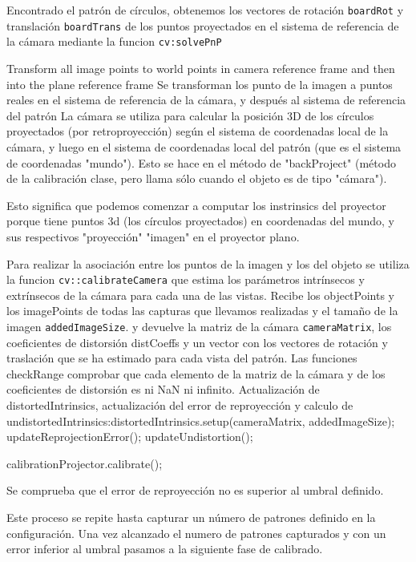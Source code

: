   
Encontrado el patrón de círculos, obtenemos los vectores de rotación \texttt{boardRot} y translación \texttt{boardTrans} de los puntos proyectados en el sistema de referencia de la cámara mediante la funcion \texttt{cv:solvePnP}


 Transform all image points to world points in camera reference frame  and then into the plane reference frame
Se transforman los punto de la imagen a puntos reales en el sistema de referencia de la cámara, y después al sistema de referencia del patrón
La cámara se utiliza para calcular la posición 3D de los círculos proyectados (por retroproyección) según el  sistema de coordenadas local de la cámara, y luego en el sistema de coordenadas local del patrón (que es el sistema de coordenadas "mundo"). Esto se hace en el método de "backProject" (método de la calibración clase, pero llama sólo cuando el objeto es de tipo "cámara"). 

Esto significa que podemos comenzar a computar los instrinsics del proyector porque tiene puntos 3d (los círculos proyectados) en coordenadas del mundo, y sus respectivos "proyección" "imagen" en el proyector plano. 

Para realizar la asociación entre los puntos de la imagen y los del objeto se utiliza la funcion \texttt{cv::calibrateCamera} que estima los parámetros intrínsecos y extrínsecos de la cámara para cada una de las vistas. Recibe los objectPoints y los imagePoints de todas las capturas que llevamos realizadas y el tamaño de la imagen \texttt{addedImageSize}. y devuelve la matriz de la cámara \texttt{cameraMatrix}, los coeficientes de distorsión {distCoeffs} y un vector con los vectores de rotación y traslación que se ha estimado para cada vista del patrón. Las funciones checkRange comprobar que cada elemento de la matriz de la cámara y de los coeficientes de distorsión es ni NaN ni infinito. Actualización de distortedIntrinsics, actualización del error de reproyección y calculo de undistortedIntrinsics:distortedIntrinsics.setup(cameraMatrix, addedImageSize);  updateReprojectionError();   updateUndistortion();

calibrationProjector.calibrate();

Se comprueba que el error de reproyección no es superior al umbral definido.

Este proceso se repite hasta capturar un número de patrones definido en la configuración. Una vez alcanzado el numero de patrones capturados y con un error inferior al umbral pasamos a la siguiente fase de calibrado.

